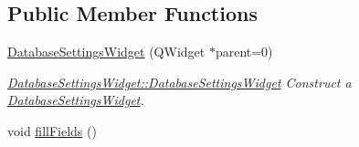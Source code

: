 \subsection*{Public Member Functions}
\begin{DoxyCompactItemize}
\item 
\hyperlink{classGui_1_1Widgets_1_1DatabaseSettingsWidget_a723805fcd8e71878c6d66b7296f16d85}{Database\-Settings\-Widget} (Q\-Widget $\ast$parent=0)
\begin{DoxyCompactList}\small\item\em \hyperlink{classGui_1_1Widgets_1_1DatabaseSettingsWidget_a723805fcd8e71878c6d66b7296f16d85}{Database\-Settings\-Widget\-::\-Database\-Settings\-Widget} Construct a \hyperlink{classGui_1_1Widgets_1_1DatabaseSettingsWidget}{Database\-Settings\-Widget}. \end{DoxyCompactList}\item 
\hypertarget{classGui_1_1Widgets_1_1DatabaseSettingsWidget_a79e2fb995dbd14f4c4d0b54bdfaf5d5f}{void \hyperlink{classGui_1_1Widgets_1_1DatabaseSettingsWidget_a79e2fb995dbd14f4c4d0b54bdfaf5d5f}{fill\-Fields} ()}\label{classGui_1_1Widgets_1_1DatabaseSettingsWidget_a79e2fb995dbd14f4c4d0b54bdfaf5d5f}


\end{DoxyCompactItemize}
